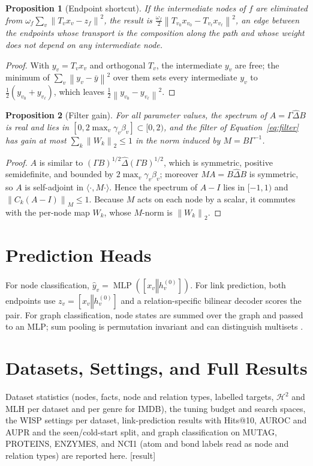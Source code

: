 \documentclass{article}
\newtheorem{proposition}{Proposition}
\newcommand{\wisp}{\textsc{WISP}}
\newcommand{\norm}[1]{\left\lVert #1\right\rVert}
\newcommand{\concat}{\mathbin\Vert}
\newcommand{\res}{{\scriptsize[result]}}
\begin{document}
\begin{proposition}[Endpoint shortcut]
If the intermediate nodes of $f$ are eliminated from $\omega_f\sum_v\norm{T_vx_v-z_f}^2$, the result is $\frac{\omega_f}{2}\norm{T_{v_0}x_{v_0}-T_{v_\ell}x_{v_\ell}}^2$, an edge between the endpoints whose transport is the composition along the path and whose weight does not depend on any intermediate node.
\end{proposition}
\begin{proof}
With $y_v=T_vx_v$ and orthogonal $T_v$, the intermediate $y_v$ are free; the minimum of $\sum_v\norm{y_v-\bar y}^2$ over them sets every intermediate $y_v$ to $\frac12(y_{v_0}+y_{v_\ell})$, which leaves $\frac12\norm{y_{v_0}-y_{v_\ell}}^2$.
\end{proof}

\begin{proposition}[Filter gain]
For all parameter values, the spectrum of $A=\Gamma\hat{\Delta}B$ is real and lies in $[0,2\max_v\gamma_v\beta_v]\subset[0,2)$, and the filter of Equation~\eqref{eq:filter} has gain at most $\sum_k\norm{W_k}_2\le1$ in the norm induced by $M=B\Gamma^{-1}$.
\end{proposition}
\begin{proof}
$A$ is similar to $(\Gamma B)^{1/2}\hat{\Delta}(\Gamma B)^{1/2}$, which is symmetric, positive semidefinite, and bounded by $2\max_v\gamma_v\beta_v$; moreover $MA=B\hat{\Delta}B$ is symmetric, so $A$ is self-adjoint in $\langle\cdot,M\cdot\rangle$. Hence the spectrum of $A-I$ lies in $[-1,1)$ and $\norm{C_k(A-I)}_M\le1$. Because $M$ acts on each node by a scalar, it commutes with the per-node map $W_k$, whose $M$-norm is $\norm{W_k}_2$.
\end{proof}

\section{Prediction Heads}
\label{app:heads}
For node classification, $\hat{y}_v=\operatorname{MLP}([x_v\concat h_v^{(0)}])$. For link prediction, both endpoints use $z_v=[x_v\concat h_v^{(0)}]$ and a relation-specific bilinear decoder scores the pair. For graph classification, node states are summed over the graph and passed to an MLP; sum pooling is permutation invariant and can distinguish multisets \cite{xu2019gin}.

\section{Datasets, Settings, and Full Results}
\label{app:data}
Dataset statistics (nodes, facts, node and relation types, labelled targets, $\mathcal{H}^2$ and MLH per dataset and per genre for IMDB), the tuning budget and search spaces, the \wisp{} settings per dataset, link-prediction results with Hits@10, AUROC and AUPR and the seen/cold-start split, and graph classification on MUTAG, PROTEINS, ENZYMES, and NCI1 (atom and bond labels read as node and relation types) are reported here. \res{}
\end{document}
